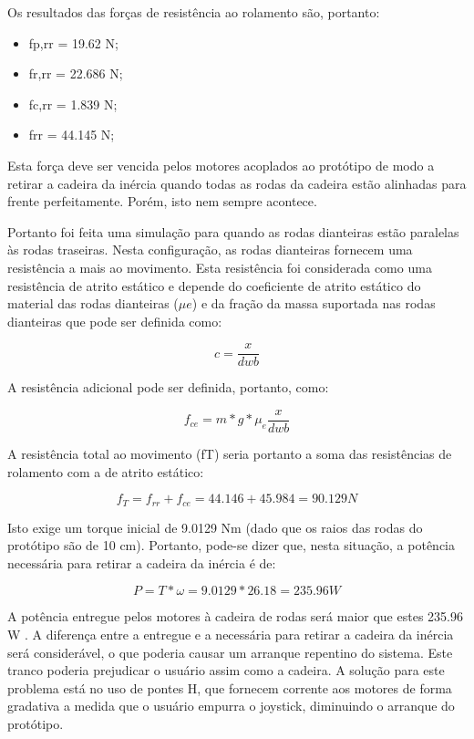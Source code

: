 Os resultados das forças de resistência ao rolamento são, portanto:

\begin{itemize}
	\item fp,rr = 19.62 N;
	\item fr,rr = 22.686 N;
	\item fc,rr = 1.839 N;
	\item frr = 44.145 N;
\end{itemize}

Esta força deve ser vencida pelos motores acoplados ao protótipo de modo a retirar a cadeira da inércia quando todas as rodas da cadeira estão alinhadas para frente perfeitamente. Porém, isto nem sempre acontece.

Portanto foi feita uma simulação para quando as rodas dianteiras estão paralelas às rodas traseiras. Nesta configuração, as rodas dianteiras fornecem uma resistência a mais ao movimento. Esta resistência foi considerada como uma resistência de atrito estático e depende do coeficiente de atrito estático do material das rodas dianteiras ($\mu e$) e da fração da massa suportada nas rodas dianteiras que pode ser definida como:

\begin{equation}
c = \frac{x}{dwb}
\end{equation}

A resistência adicional pode ser definida, portanto, como:

\begin{equation}
f_{ce}= m*g* \mu_e \frac{x}{dwb}
\end{equation}

A resistência total ao movimento (fT) seria portanto a soma das resistências de rolamento com a de atrito estático:

\begin{equation}
f_T = f_{rr} + f_{ce} = 44.146+45.984 = 90.129 N
\end{equation}

Isto exige um torque inicial de 9.0129 Nm (dado que os raios das rodas do protótipo são de 10 cm). Portanto, pode-se dizer que, nesta situação, a potência necessária para retirar a cadeira da inércia é de:

\begin{equation}
P = T*\omega = 9.0129*26.18 = 235.96 W
\end{equation}

  A potência entregue pelos motores à cadeira de rodas será maior que estes 235.96 W . A diferença entre a entregue e a necessária para retirar a cadeira da inércia será considerável, o que poderia causar um arranque repentino do sistema. Este tranco poderia prejudicar o usuário assim como a cadeira. A solução para este problema está no uso de pontes H, que fornecem corrente aos motores de forma gradativa a medida que o usuário empurra o joystick, diminuindo o arranque do protótipo.

